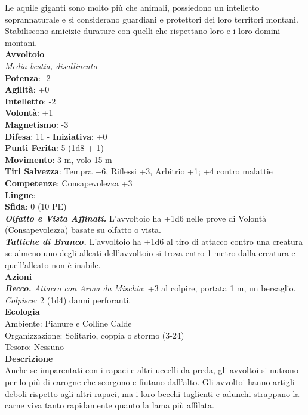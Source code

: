 \begin{multicols}{2}
Le aquile giganti sono molto più che animali, possiedono un intelletto soprannaturale e si considerano guardiani e protettori dei loro territori montani.\\

Stabiliscono amicizie durature con quelli che rispettano loro e i loro domini montani.\\

\medskip\textbf{Avvoltoio}\\
\emph{Media bestia, disallineato}\\
\textbf{Potenza}: -2\\
\textbf{Agilità}: +0\\
\textbf{Intelletto}: -2\\
\textbf{Volontà}: +1\\
\textbf{Magnetismo}: -3\\
\textbf{Difesa}: 11 - \textbf{Iniziativa}: +0\\
\textbf{Punti Ferita}: 5 (1d8 + 1)\\
\textbf{Movimento}: 3 m, volo 15 m\\
\textbf{Tiri Salvezza}: Tempra +6, Riflessi +3, Arbitrio +1; +4 contro malattie\\
\textbf{Competenze}: Consapevolezza +3\\
\textbf{Lingue}: -\\
\textbf{Sfida}: 0 (10 PE)\smallskip\\
\emph{\textbf{Olfatto e Vista Affinati.}} L'avvoltoio ha +1d6 nelle prove di Volontà (Consapevolezza) basate su olfatto o vista.\\
\emph{\textbf{Tattiche di Branco.}} L'avvoltoio ha +1d6 al tiro di attacco contro una creatura se almeno uno degli alleati dell'avvoltoio si trova entro 1 metro dalla creatura e quell'alleato non è inabile.\\
\smallskip\textbf{Azioni}\\
\emph{\textbf{Becco.} Attacco con Arma da Mischia}: +3 al colpire, portata 1 m, un bersaglio.\\
\emph{Colpisce:} 2 (1d4) danni perforanti.\\
\textbf{Ecologia}\\
Ambiente: Pianure e Colline Calde\\
Organizzazione: Solitario, coppia o stormo (3-24)\\
Tesoro: Nessuno\\
\textbf{Descrizione}\\
Anche se imparentati con i rapaci e altri uccelli da preda, gli avvoltoi si nutrono per lo più di carogne che scorgono e fiutano dall'alto. Gli avvoltoi hanno artigli deboli rispetto agli altri rapaci, ma i loro becchi taglienti e adunchi strappano la carne viva tanto rapidamente quanto la lama più affilata.\\


\end{multicols}
